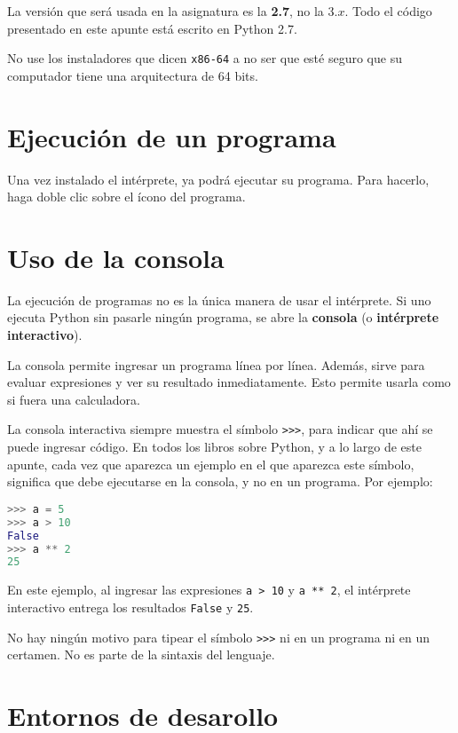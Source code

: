 La versión que será usada en la asignatura es la \textbf{2.7}, no la 3.\(x\).
Todo el código presentado en este apunte está escrito en Python 2.7.

No use los instaladores que dicen \lstinline!x86-64! a no ser que esté
seguro que su computador tiene una arquitectura de 64 bits.

\section{Ejecución de un programa}

Una vez instalado el intérprete, ya podrá ejecutar su programa.
Para hacerlo, haga doble clic sobre el ícono del programa.

\section{Uso de la consola}

La ejecución de programas no es la única manera de usar el
intérprete. Si uno ejecuta Python sin pasarle ningún programa, se abre
la \textbf{consola} (o \textbf{intérprete interactivo}).

La consola permite ingresar un programa línea por línea. Además, sirve
para evaluar expresiones y ver su resultado inmediatamente. Esto permite
usarla como si fuera una calculadora.

La consola interactiva siempre muestra el símbolo \lstinline!>>>!, para
indicar que ahí se puede ingresar código. En todos los libros sobre
Python, y a lo largo de este apunte, cada vez que aparezca un ejemplo en
el que aparezca este símbolo, significa que debe ejecutarse en la
consola, y no en un programa. Por ejemplo:

\begin{lstlisting}[language=py]
>>> a = 5
>>> a > 10
False
>>> a ** 2
25
\end{lstlisting}

En este ejemplo, al ingresar las expresiones \lstinline!a > 10! y
\lstinline!a ** 2!, el intérprete interactivo entrega los resultados
\lstinline!False! y \lstinline!25!.

No hay ningún motivo para tipear el símbolo \lstinline!>>>! ni en un
programa ni en un certamen. No es parte de la sintaxis del
lenguaje.

\section{Entornos de desarollo}

